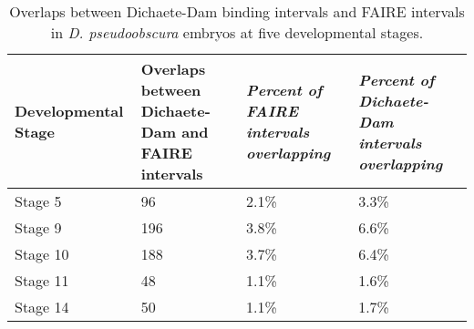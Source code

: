 \begin{table}[h]
\centering
\begin{tabular}{|l|p{3cm}|p{3cm}|p{3cm}|}
\hline
\textbf{Developmental Stage} & \textbf{Overlaps between Dichaete-Dam and FAIRE intervals} & \emph{Percent of FAIRE intervals overlapping} & \emph{Percent of Dichaete-Dam intervals overlapping} \\ \hline
Stage 5             & 96                                                & 2.1\%                                  & 3.3\%                                         \\ \hline
Stage 9             & 196                                               & 3.8\%                                  & 6.6\%                                         \\ \hline
Stage 10            & 188                                               & 3.7\%                                  & 6.4\%                                         \\ \hline
Stage 11            & 48                                                & 1.1\%                                  & 1.6\%                                         \\ \hline
Stage 14            & 50                                                & 1.1\%                                  & 1.7\%                                         \\ \hline
\end{tabular}
\caption{Overlaps between Dichaete-Dam binding intervals and FAIRE intervals in \emph{D. pseudoobscura} embryos at five developmental stages.}
\label{Table 6.5}
\end{table}

